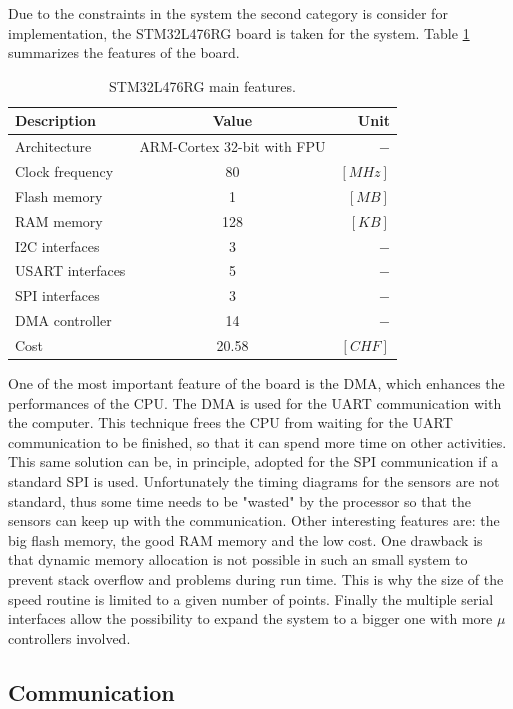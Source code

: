 \documentclass[12pt,a4paper, twoside]{article}
\begin{document}
Due to the constraints in the system the second category is consider for implementation, the  STM32L476RG board is taken for the system. Table \ref{tab:board} summarizes the features of the board.
\begin{table}[H]
	\centering
	\begin{tabular}{l||c|r} 
		\textbf{Description}&\textbf{Value}  &\textbf{Unit}  \\ 
		\hline
		\hline 
		Architecture & ARM-Cortex 32-bit with FPU & $-$ \\ 
		\hline 
		Clock frequency & 80  & $[MHz]$  \\ 
		\hline 
		Flash memory & 1 & $[MB]$ \\ 
		\hline 
		RAM memory & 128 & $[KB]$  \\ 
		\hline 
		I2C interfaces & 3 & $-$  \\ 
		\hline 
		USART interfaces & 5  & $-$  \\ 
		\hline 
		SPI interfaces & 3  & $-$  \\  
		\hline 
		DMA controller & 14 & $-$  \\
		\hline
		Cost & 20.58 &$[CHF]$
	\end{tabular} 
	\caption{STM32L476RG main features.}
	\label{tab:board}
\end{table}
One of the most important feature of the board is the DMA, which enhances the performances of the CPU. The DMA is used for the UART communication with the computer. This technique frees the CPU from waiting for the UART communication to be finished, so that it can spend more time on other activities. This same solution can be, in principle, adopted for the SPI communication if a standard SPI is used. Unfortunately the timing diagrams for the sensors are not standard, thus some time needs to be "wasted" by the processor so that the sensors can keep up with the communication.
Other interesting features are: the big flash memory, the good RAM memory and the low cost. One drawback is that dynamic memory allocation is not possible in such an small system to prevent stack overflow and problems during run time. This is why the size of the speed routine is limited to a given number of points.
Finally the multiple serial interfaces allow the possibility to expand the system to a bigger one with more $\mu$controllers involved.

\subsection{Communication}
\end{document}
